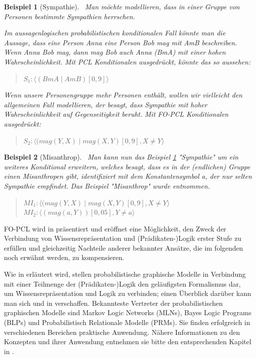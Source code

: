 \documentclass[a4paper, 11pt]{book}
\newtheorem{Bsp}{Beispiel}[section]
\begin{document}
\begin{Bsp}[Sympathie]\label{sec:BspSmp}\
Man möchte modellieren, dass in einer Gruppe von Personen bestimmte Sympathien herrschen.

Im aussagenlogischen probabilistischen konditionalen Fall könnte man die Aussage, dass eine Person Anna eine Person Bob mag mit AmB beschreiben. Wenn Anna Bob mag, dann mag Bob auch Anna (BmA) mit einer hohen Wahrscheinlichkeit.
Mit PCL Konditionalen ausgedrückt, könnte das so aussehen:
\begin{quote}
$ S_{1} : \langle (BmA \mid AmB)[0,9]\rangle$\\
\end{quote}
Wenn unsere Personengruppe mehr Personen enthält, wollen wir vielleicht den allgemeinen Fall modellieren, der besagt, dass Sympathie mit hoher Wahrscheinlichkeit auf Gegenseitigkeit beruht.
Mit FO-PCL Konditionalen ausgedrückt:
\begin{quote}
	$ S_{2} : \langle (mag(Y, X) \mid mag(X, Y)[0,9], X \neq Y \rangle$\\
\end{quote}

\end{Bsp}

\begin{Bsp}[Misanthrop]\label{sec:Misanthrop}\
Man kann nun das Beispiel \ref{sec:BspSmp} "{}Sympathie"{} um ein weiteres Konditional erweitern, welches besagt, dass es in der (endlichen) Gruppe einen Misanthropen gibt, identifiziert mit dem Konstantensymbol a, der nur selten Sympathie empfindet. Das Beispiel "{}Misanthrop"{} wurde \cite[Bsp. 6.5.3, S. 144]{Fis10} entnommen.
\begin{quote}
$ MI_1 : \langle (mag(Y, X) \mid mag(X, Y)[0,9], X \neq Y \rangle$\\
$ MI_2 : \langle (mag(a, Y))[0,05], Y \neq a \rangle$\\
\end{quote}


\end{Bsp}
FO-PCL wird in \cite[Kap. 6]{Fis10} präsentiert und eröffnet eine Möglichkeit, den Zweck der Verbindung von Wissensrepräsentation und (Prädikaten-)Logik erster Stufe zu erfüllen und gleichzeitig Nachteile anderer bekannter Ansätze, die im folgenden noch erwähnt werden, zu kompensieren.     

                            
Wie in \cite[S. 19]{Fis09} erläutert wird, stellen probabilistische graphische Modelle in Verbindung mit einer Teilmenge der (Prädikaten-)Logik den geläufigsten Formalismus dar, um Wissensrepräsentation und Logik zu verbinden; einen Überblick darüber kann man sich \cite{SBAR08} und in \cite[Kap. 10]{GT07} verschaffen. Bekannteste Vertreter der probabilistischen graphischen Modelle sind Markov Logic Networks (MLNs), Bayes Logic Programs (BLPs) und Probabilistisch Relationale Modelle (PRMs). Sie finden erfolgreich in verschiedenen Bereichen praktische Anwendung.
Nähere Informationen zu den Konzepten und ihrer Anwendung entnehmen sie bitte den entsprechenden Kapitel in \cite{GT07}.
\end{document}
